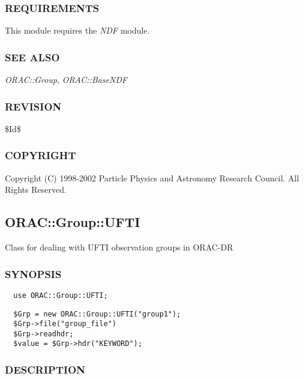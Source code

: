 \subsubsection*{REQUIREMENTS\label{ORAC::Group::NDF_REQUIREMENTS}}


This module requires the \emph{NDF} module.

\subsubsection*{SEE ALSO\label{ORAC::Group::NDF_SEE_ALSO}}


\emph{ORAC::Group}, \emph{ORAC::BaseNDF}

\subsubsection*{REVISION\label{ORAC::Group::NDF_REVISION}}


\$Id\$

\subsubsection*{COPYRIGHT\label{ORAC::Group::NDF_COPYRIGHT}}


Copyright (C) 1998-2002 Particle Physics and Astronomy Research
Council. All Rights Reserved.

\subsection{ORAC::Group::UFTI\label{ORAC::Group::UFTI}}


Class for dealing with UFTI observation groups in ORAC-DR

\subsubsection*{SYNOPSIS\label{ORAC::Group::UFTI_SYNOPSIS}}
\begin{verbatim}
  use ORAC::Group::UFTI;
\end{verbatim}
\begin{verbatim}
  $Grp = new ORAC::Group::UFTI("group1");
  $Grp->file("group_file")
  $Grp->readhdr;
  $value = $Grp->hdr("KEYWORD");
\end{verbatim}
\subsubsection*{DESCRIPTION\label{ORAC::Group::UFTI_DESCRIPTION}}


